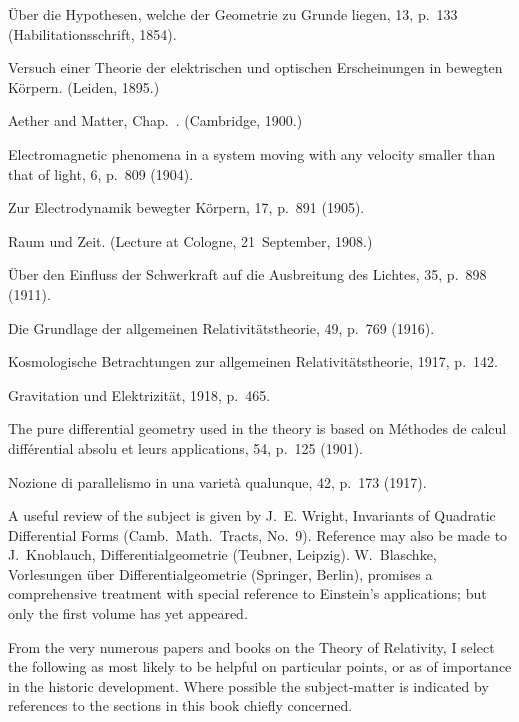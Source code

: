 \documentclass[12pt]{book}
\begin{document}
 Über die Hypothesen, welche der Geometrie zu Grunde liegen,  13, p.~133 (Habilitationsschrift, 1854).

 Versuch einer Theorie der elektrischen und optischen Erscheinungen in
bewegten Körpern. (Leiden, 1895.)

 Aether and Matter, Chap.~. (Cambridge, 1900.)

 Electromagnetic phenomena in a system moving with any velocity smaller
than that of light,  6, p.~809 (1904).

 Zur Electrodynamik bewegter Körpern,  17, p.~891 (1905).

 Raum und Zeit. (Lecture at Cologne, 21~September, 1908.)

 Über den Einfluss der Schwerkraft auf die Ausbreitung des Lichtes,  35, p.~898 (1911).

 Die Grundlage der allgemeinen Relativitätstheorie,  49, p.~769
(1916).

 Kosmologische Betrachtungen zur allgemeinen Relativitätstheorie,  1917, p.~142.

 Gravitation und Elektrizität,  1918, p.~465.
\medskip

The pure differential geometry used in the theory is based on
 Méthodes de calcul différential absolu et leurs
applications, \Title{Math.\ Ann.,} 54, p.~125 (1901).

 Nozione di parallelismo in una varietà qualunque,  42, p.~173 (1917).
\medskip

A useful review of the subject is given by J.~E. Wright, Invariants of Quadratic Differential
Forms (Camb.\ Math.\ Tracts, No.~9). Reference may also be made to J.~Knoblauch,
Differentialgeometrie (Teubner, Leipzig). W.~Blaschke, Vorlesungen über Differentialgeometrie
(Springer, Berlin), promises a comprehensive treatment with special reference
to Einstein's applications; but only the first volume has yet appeared.
\medskip

From the very numerous papers and books on the Theory of Relativity, I select the
following as most likely to be helpful on particular points, or as of importance in the historic
development. Where possible the subject\hyp{}matter is indicated by references to the sections
in this book chiefly concerned.
\end{document}
